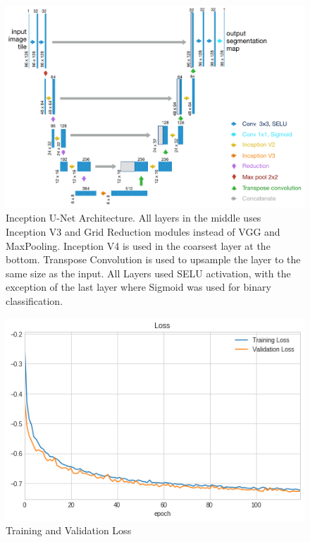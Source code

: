 \documentclass{article}
\begin{document}
\begin{figure}[ht]
 \centering
  \includegraphics[width=0.8\linewidth]{figures/inception-u-net.png}
  \caption{
      Inception U-Net Architecture. All layers in the middle uses Inception V3 and Grid Reduction modules instead of VGG and MaxPooling. Inception V4 is used in the coarsest layer at the bottom. Transpose Convolution is used to upsample the layer to the same size as the input. All Layers used SELU activation, with the exception of the last layer where Sigmoid was used for binary classification.
  }
  \label{fig:inception-u-net}
\end{figure}





\bigskip


\bigskip



\bigskip

\begin{figure}[h]
 \centering
  \includegraphics[width=1.0\linewidth]{figures/loss.png}
  \caption{
      Training and Validation Loss
  }
  \label{fig:loss}
\end{figure}
\end{document}
